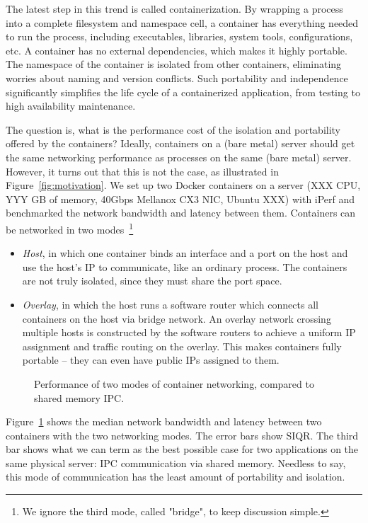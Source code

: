 The latest step in this trend is called containerization.  By wrapping a process
into a complete filesystem and namespace cell, a container has everything needed
to run the process, including executables, libraries, system tools,
configurations, etc. A container has no external dependencies, which makes it
highly portable. The namespace of the container is isolated from other
containers, eliminating worries about naming and version conflicts.  Such
portability and independence significantly simplifies the life cycle of a
containerized application, from testing to high availability maintenance.

The question is, what is the performance cost of the isolation and portability
offered by the containers? Ideally, containers on a (bare metal) server should
get the same networking performance as processes on the same (bare metal)
server. However, it turns out that this is not the case, as illustrated in
Figure~\ref{fig:motivation}.  We set up two Docker
containers on a server (XXX CPU, YYY GB of memory, 40Gbps Mellanox CX3 NIC, Ubuntu
XXX) with iPerf and benchmarked the network bandwidth and latency between
them. Containers can be networked in two modes~\footnote{We ignore the third
mode, called "bridge", to keep discussion simple.} 
\begin{itemize}
\item {\em Host}, in which one container binds an interface and a port on the
    host and use the host's IP to communicate, like an ordinary process. The
    containers are not truly isolated, since they must share the port space.
\item {\em Overlay}, in which the host runs a software router which connects
    all containers on the host via bridge network. An overlay network crossing
    multiple hosts is constructed by the software routers to achieve a uniform
    IP assignment and traffic routing on the overlay. This makes containers
    fully portable -- they can even have public IPs assigned to them.
\end{itemize}

\begin{figure}[ht]
     \centering 
     \label{fig:three_modes}
     \caption{Performance of two modes of container networking, compared to
     shared memory IPC.} 
\end{figure} 

Figure~\ref{fig:three_modes} shows the median network bandwidth and latency
between two containers with the two networking modes. The error bars show SIQR.
The third bar shows what we can term as the best possible case for two
applications on the same physical server: IPC communication via shared memory.
Needless to say, this mode of communication has the least amount of portability
and isolation.

